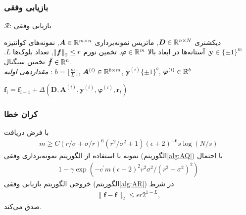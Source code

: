 \begin{frame}
\frametitle{بازیابی وفقی}
\begin{algorithm}[H]
	\caption{$ \mathcal{R} $: بازیابی وفقی}
	\label{alg:AR}
	\begin{algorithmic}[1]
		\renewcommand{\algorithmicrequire}{\textbf{ورودی:}}
		\renewcommand{\algorithmicensure}{\textbf{خروجی:}}
		\REQUIRE دیکشنری $ \bm{D}\in\mathbb{R}^{n\times N} $, ماتریس نمونه‌برداری $ \bm{A}\in\mathbb{R}^{m\times n} $, نمونه‌های کوانتیزه $ \bm{y} \in \lbrace\pm 1\rbrace^{m} $, آستانه‌ها در ابعاد بالا $ \bm{\varphi}\in\mathbb{R}^{m} $, تخمین نورم $ \left\lVert\bm{f}\right\rVert_{2}\leq r $, تعداد بلوک‌ها $ L $.
		\ENSURE  تخمین سیگنال $ \hat{\bm{f}}\in \mathbb{R}^{n} $.
		\\ \textit{مقداردهی اولیه} :  $ b = \lfloor\frac{m}{L}\rfloor $, $ \bm{A}^{(i)}\in \mathbb{R}^{b\times m}$, $ \bm{y}^{\left(i\right)} \lbrace\pm 1\rbrace^{b}$, $\bm{\varphi}^{\left(i\right)}\in \mathbb{R}^{b} $
		\begin{latin}
		\STATE $ \bm{f}_{i} =\bm{f}_{i-1}+ \varDelta\left(\bm{D},\bm{A}^{(i)},\bm{y}^{\left(i\right)},\bm{\varphi}^{\left(i\right)},\bm{r}_{t}\right) $ 
		\ENDFOR
		\end{latin}
	\end{algorithmic} 
\end{algorithm}
\end{frame}
\begin{frame}
\frametitle{کران خطا}
\begin{theorem}
با فرض دریافت
\begin{align}
 m \geq C(r/\sigma+\sigma / r)^{6}(r^{2}/\sigma^2+1)(\epsilon+2)^{-6}s \log (N/s) 
\end{align} 
نمونه با استفاده از الگوریتم نمونه‌برداری وفقی
(الگوریتم\ref{alg:AQ})
با احتمال 
\begin{align}
 1-\gamma \exp{(-c^{\prime}m (\epsilon+2)^{2} r^2\sigma^2/ (r^2+\sigma^2)^2)} 
\end{align}
خروجی الگوریتم بازیابی وفقی
(الگوریتم\ref{alg:AR}) 
در شرط  
\begin{align}
\|\bm{f}-\hat{\bm{f}}\|_{2}\leq \epsilon r2^{1-L},
\end{align}
صدق می‌کند.
\end{theorem}

\end{frame}
